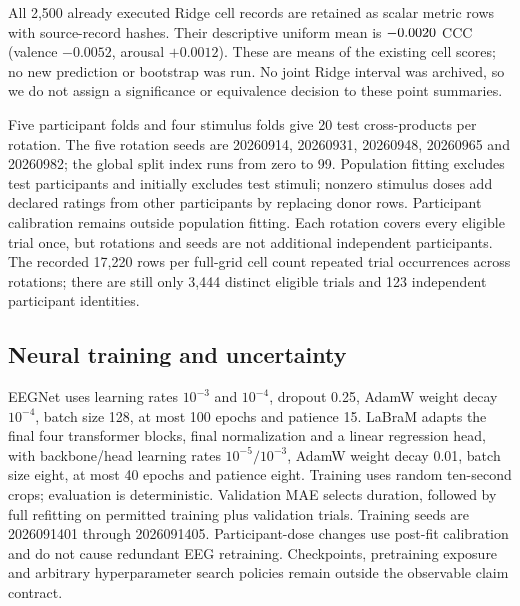 All 2,500 already executed Ridge cell records are retained as scalar metric
rows with source-record hashes. Their descriptive uniform mean is
$-0.0020$ CCC (valence $-0.0052$, arousal $+0.0012$). These are means
of the existing cell scores; no new prediction or bootstrap was run. No joint
Ridge interval was archived, so we do not assign a significance or equivalence
decision to these point summaries.

Five participant folds and four stimulus folds give 20 test cross-products per
rotation. The five rotation seeds are 20260914, 20260931, 20260948, 20260965
and 20260982; the global split index runs from zero to 99. Population fitting
excludes test participants and initially excludes test stimuli; nonzero
stimulus doses add declared ratings from other participants by replacing donor
rows. Participant calibration remains outside population fitting. Each
rotation covers every eligible trial once, but rotations and seeds are not
additional independent participants. The recorded 17,220 rows per full-grid
cell count repeated trial occurrences across rotations; there are still only
3,444 distinct eligible trials and 123 independent participant identities.

\subsection{Neural training and uncertainty}
EEGNet uses learning rates $10^{-3}$ and $10^{-4}$, dropout 0.25, AdamW weight
decay $10^{-4}$, batch size 128, at most 100 epochs and patience 15.
LaBraM adapts the final four transformer blocks, final normalization and a
linear regression head, with backbone/head learning rates $10^{-5}/10^{-3}$,
AdamW weight decay 0.01, batch size eight, at most 40 epochs and patience eight.
Training uses random ten-second crops; evaluation is deterministic. Validation
MAE selects duration, followed by full refitting on permitted training plus
validation trials. Training seeds are 2026091401 through 2026091405.
Participant-dose changes use post-fit calibration and do not cause redundant
EEG retraining. Checkpoints, pretraining exposure and arbitrary hyperparameter
search policies remain outside the observable claim contract.

